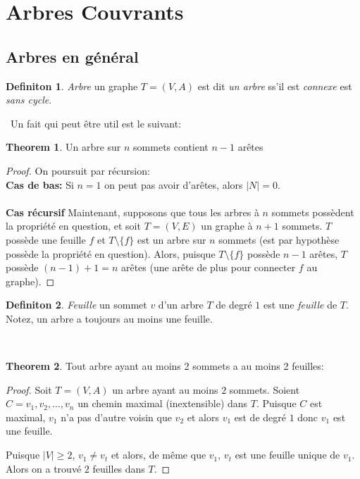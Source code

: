 \documentclass[french]{article}
\theoremstyle{definition}
\newtheorem{definition}{Definiton}[subsection]
\newtheorem{theorem}{Theorem}[section]
\begin{document}
		\section{Arbres Couvrants}
		
		\subsection{Arbres en général}
		\begin{definition}{\textit{Arbre}}
			un graphe $T = (V, A)$ est dit \textit{un arbre} ss'il est \textit{connexe} est \textit{sans cycle}.
		\end{definition}
		\
		Un fait qui peut être util est le suivant:\\

		\begin{theorem}{Un arbre sur $n$ sommets contient $n - 1$ arêtes}
			\begin{proof}
				On poursuit par récursion:\\
				\textbf{Cas de bas:}
				Si $n = 1$ on peut pas avoir d'arêtes, alors $|N| = 0$.\\
				\\
				\textbf{Cas récursif}
				Maintenant, supposons que tous les arbres à $n$ sommets possèdent la propriété en question, et soit $T = (V, E)$ un graphe à $n + 1$ sommets. $T$ possède une feuille $f$ et $T \setminus \{f\}$ est un arbre sur $n$ sommets (est par hypothèse possède la propriété en question). Alors, puisque $T \setminus \{f\}$ possède $n - 1$ arêtes, $T$ possède $(n - 1) + 1 = n$ arêtes (une arête de plus pour connecter $f$ au graphe).
			\end{proof} 
		\end{theorem}
		\begin{definition}{\textit{Feuille}}
			un sommet $v$ d'un arbre $T$ de degré $1$ est une \textit{feuille} de $T$. Notez, un arbre a toujours au moins une feuille.
		\end{definition}
		\
		\begin{theorem}{Tout arbre ayant au moins 2 sommets a au moins 2 feuilles:}
			\begin{proof}
				Soit $T = (V, A)$ un arbre ayant au moins $2$ sommets. Soient $C = v_1, v_2, \dots , v_n$ un chemin maximal (inextensible) dans $T$. Puisque $C$ est maximal, $v_1$ n'a pas d'autre voisin que $v_2$ et alors $v_1$ est de degré $1$ donc $v_1$ est une feuille.

				Puisque $|V| \geq 2$, $v_1 \neq v_t$ et alors, de même que $v_1$, $v_t$ est une feuille unique de $v_1$. Alors on a trouvé $2$ feuilles dans $T$.
			\end{proof}
		\end{theorem}
\end{document}

